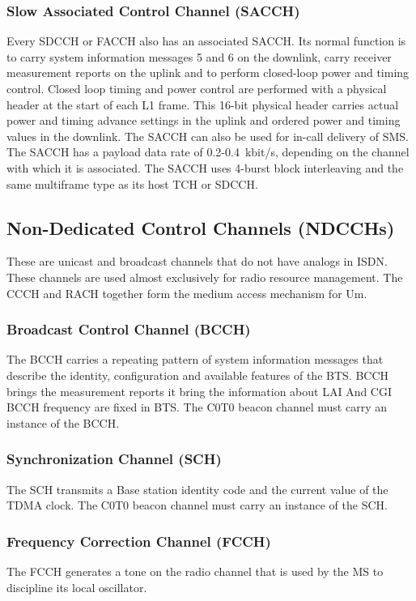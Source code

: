 \documentclass[11pt,openany]{book}
\begin{document}
\subsubsection{Slow Associated Control Channel (SACCH)}
Every SDCCH or FACCH also has an associated SACCH. Its normal function is to carry system information messages 5 and 6 on the downlink, carry receiver measurement reports on the uplink and to perform closed-loop power and timing control. Closed loop timing and power control are performed with a physical header at the start of each L1 frame. This 16-bit physical header carries actual power and timing advance settings in the uplink and ordered power and timing values in the downlink. The SACCH can also be used for in-call delivery of SMS. The SACCH has a payload data rate of 0.2-0.4~kbit/s, depending on the channel with which it is associated. The SACCH uses 4-burst block interleaving and the same multiframe type as its host TCH or SDCCH.

\subsection{Non-Dedicated Control Channels (NDCCHs)}
These are unicast and broadcast channels that do not have analogs in ISDN. These channels are used almost exclusively for radio resource management. The CCCH and RACH together form the medium access mechanism for Um.

\subsubsection{Broadcast Control Channel (BCCH)}
The BCCH carries a repeating pattern of system information messages that describe the identity, configuration and available features of the BTS. BCCH brings the measurement reports it bring the information about LAI And CGI BCCH frequency are fixed in BTS.
The C0T0 beacon channel must carry an instance of the BCCH.

\subsubsection{Synchronization Channel (SCH)}
The SCH transmits a Base station identity code and the current value of the TDMA clock.
The C0T0 beacon channel must carry an instance of the SCH.

\subsubsection{Frequency Correction Channel (FCCH)}
The FCCH generates a tone on the radio channel that is used by the MS to discipline its local oscillator.
\end{document}
